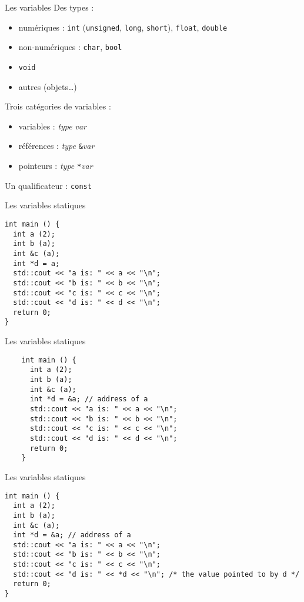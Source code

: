 \begin{frame}{Les variables}
  Des types :
  \begin{itemize}
  \item numériques : \texttt{int} (\texttt{unsigned}, \texttt{long}, \texttt{short}), \texttt{float}, \texttt{double}
  \item non-numériques : \texttt{char}, \texttt{bool}
  \item \texttt{void}
  \item autres (objets\dots{})
  \end{itemize}

  Trois catégories de variables :
  \begin{itemize}
  \item variables : \textit{type} \textit{var}
  \item références : \textit{type} \texttt{\&}\textit{var}
  \item pointeurs : \textit{type} \texttt{*}\textit{var}
  \end{itemize}

  Un qualificateur : \texttt{const}
\end{frame}

\begin{frame}[fragile]{Les variables statiques}
  \begin{lstlisting}
int main () {
  int a (2);
  int b (a);
  int &c (a);
  int *d = a;
  std::cout << "a is: " << a << "\n";
  std::cout << "b is: " << b << "\n";
  std::cout << "c is: " << c << "\n";
  std::cout << "d is: " << d << "\n";
  return 0;
}
  \end{lstlisting}
\end{frame}

\begin{frame}[fragile]{Les variables statiques}
  \begin{lstlisting}
    int main () {
      int a (2);
      int b (a);
      int &c (a);
      int *d = &a; // address of a
      std::cout << "a is: " << a << "\n";
      std::cout << "b is: " << b << "\n";
      std::cout << "c is: " << c << "\n";
      std::cout << "d is: " << d << "\n";
      return 0;
    }
  \end{lstlisting}
\end{frame}

\begin{frame}[fragile]{Les variables statiques}
  \begin{lstlisting}
int main () {
  int a (2);
  int b (a);
  int &c (a);
  int *d = &a; // address of a
  std::cout << "a is: " << a << "\n";
  std::cout << "b is: " << b << "\n";
  std::cout << "c is: " << c << "\n";
  std::cout << "d is: " << *d << "\n"; /* the value pointed to by d */
  return 0;
}
  \end{lstlisting}
\end{frame}


